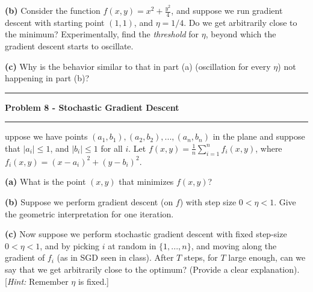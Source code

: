 \documentclass[11pt]{article}
\newcommand\question[2]{\vspace{.25in}\hrule\textbf{#1}\vspace{.5em}\hrule\vspace{.10in}}
\renewcommand\part[1]{\vspace{.10in}\textbf{(#1)}}
\begin{document}

\part{b} Consider the function $f(x, y) = x^2 + \frac{y^2}{4}$, and suppose we run gradient descent with starting point $(1, 1)$, and $\eta = 1/4$. Do we get arbitrarily close to the minimum? Experimentally, find the \textit{threshold} for $\eta$, beyond which the gradient descent starts to oscillate.


\part{c} Why is the behavior similar to that in part (a) (oscillation for every $\eta$) not happening in part (b)?


\question{Problem 8 - Stochastic Gradient Descent}

Suppose we have points $(a_1, b_1), (a_2, b_2), ... , (a_n, b_n)$ in the plane and suppose that $\vert a_i \vert \leq 1$, and $\vert b_i \vert \leq 1$ for all $i$. Let $f(x, y) = \frac{1}{n} \sum_{i = 1}^n f_i(x, y)$, where $f_i(x, y) = (x - a_i)^2 + (y - b_i)^2$.

\part{a} What is the point $(x , y)$ that minimizes $f(x, y)$?


\part{b} Suppose we perform gradient descent (on $f$) with step size $0 < \eta < 1$. Give the geometric interpretation for one iteration.


\part{c} Now suppose we perform stochastic gradient descent with fixed step-size $0 < \eta < 1$, and by picking $i$ at random in $\{1, ... , n\}$, and moving along the gradient of $f_i$ (as in SGD seen in class). After $T$ steps, for $T$ large enough, can we say that we get arbitrarily close to the optimum? (Provide a clear explanation). [\textit{Hint:} Remember $\eta$ is fixed.]
\end{document}
